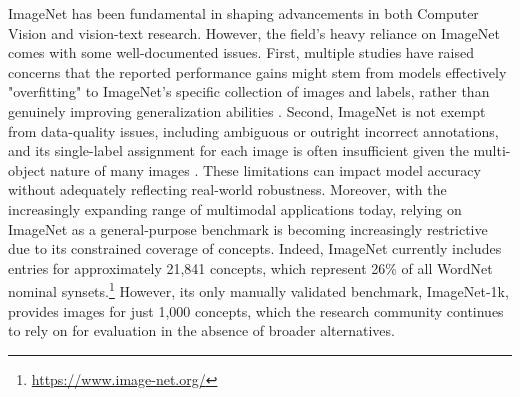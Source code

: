 \documentclass[11pt]{article}
\begin{document}
ImageNet has been fundamental in shaping advancements in both Computer Vision and vision-text research. However, the field’s heavy reliance on ImageNet comes with some well-documented issues. 
First, multiple studies have raised concerns that the reported performance gains might stem from models effectively "overfitting" to ImageNet's specific collection of images and labels, rather than genuinely improving generalization abilities \citep{recht2019imagenet, beyer2020we}.
Second, ImageNet is not exempt from data-quality issues, including ambiguous or outright incorrect annotations, and its single-label assignment for each image is often insufficient given the multi-object nature of many images \citep{beyer2020we}. 
These limitations can impact model accuracy without adequately reflecting real-world robustness.
Moreover, with the increasingly expanding range of multimodal applications today, relying on ImageNet as a general-purpose benchmark is becoming increasingly restrictive due to its constrained coverage of concepts.
Indeed, ImageNet currently includes entries for approximately 21,841 concepts, which represent 26\% of all WordNet nominal synsets.\footnote{\url {https://www.image-net.org/}} 
However, its only manually validated benchmark, ImageNet-1k, provides images for just 1,000 concepts, which the research community continues to rely on for evaluation in the absence of broader alternatives.
\end{document}
